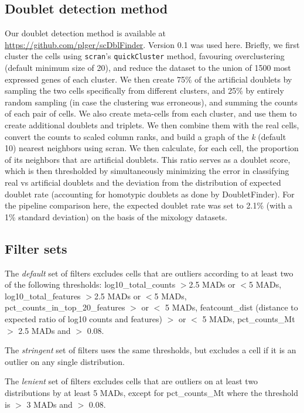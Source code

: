 \documentclass{bmcart}
\begin{document}
\subsection*{Doublet detection method}
Our doublet detection method is available at \url{https://github.com/plger/scDblFinder}. Version 0.1 was used here. Briefly, we first cluster the cells using \texttt{scran}'s \texttt{quickCluster} method, favouring overclustering (default minimum size of 20), and reduce the dataset to the union of 1500 most expressed genes of each cluster. We then create 75\% of the artificial doublets by sampling the two cells specifically from different clusters, and 25\% by entirely random sampling (in case the clustering was erroneous), and summing the counts of each pair of cells. We also create meta-cells from each cluster, and use them to create additional doublets and triplets. We then combine them with the real cells, convert the counts to scaled column ranks, and build a graph of the \textit{k} (default 10) nearest neighbors using scran. We then calculate, for each cell, the proportion of its neighbors that are artificial doublets. This ratio serves as a doublet score, which is then thresholded by simultaneously minimizing the error in classifying real vs artificial doublets and the deviation from the distribution of expected doublet rate (accounting for homotypic doublets as done by DoubletFinder). For the pipeline comparison here, the expected doublet rate was set to 2.1\% (with a 1\% standard deviation) on the basis of the mixology datasets.

\subsection*{Filter sets}
The \textit{default} set of filters excludes cells that are outliers according to at least two of the following thresholds: log10\_total\_counts $>$2.5 MADs or $<$5 MADs, log10\_total\_features $>$2.5 MADs or $<$5 MADs, pct\_counts\_in\_top\_20\_features $>$ or $<$ 5 MADs, featcount\_dist (distance to expected ratio of log10 counts and features) $>$ or $<$ 5 MADs, pct\_counts\_Mt $>$ 2.5 MADs and $>$ 0.08.

The \textit{stringent} set of filters uses the same thresholds, but excludes a cell if it is an outlier on any single distribution. 

The \textit{lenient} set of filters excludes cells that are outliers on at least two distributions by at least 5 MADs, except for pct\_counts\_Mt where the threshold is $>$ 3 MADs and $>$ 0.08.
\end{document}
